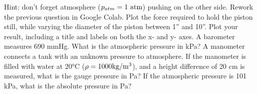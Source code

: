 \begin{homework}
Hint: don't forget atmosphere ($p_{atm}=1 \rm\ atm$) pushing on the other side.
\question Rework the previous question in Google Colab.  Plot the force required to hold the piston still, while varying the diameter of the piston between 1'' and 10''.  Plot your result, including a title and labels on both the x- and y- axes.
\question A barometer measures 690 mmHg.  What is the atmospheric pressure in kPa? \answer{[92 kPa]}
\question A manometer connects a tank with an unknown pressure to atmosphere.  If the manometer is filled with water at 20°C ($\rho = 1000 {\rm kg/m^3}$), and a height difference of 20 cm is measured, what is the gauge pressure in Pa?  \answer{[1962 Pa]}  If the atmospheric pressure is 101 kPa, what is the absolute pressure in Pa? \answer{[102.96 kPa]}
\end{homework}
